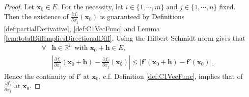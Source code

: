 \begin{proof}
  Let $\mathbf{x}_{0}\in E$.
  For the necessity,
  let $i\in\{1,\cdots,m\}$ and $j\in\{1,\cdots,n\}$ fixed.
  Then the existence of
  $\frac{\partial f_{i}}{\partial x_{j}}(\mathbf{x}_{0})$ is guaranteed by
  Definitions \ref{def:partialDerivative}, \ref{def:C1VecFunc} and
  Lemma \ref{lem:totalDiffImpliesDirectionalDiff}. 
  Using the Hilbert-Schmidt norm gives that
  \begin{align*}
    \forall &\mathbf{h}\in \mathbb{R}^{n}\text{ with }
    \mathbf{x}_{0}+\mathbf{h}\in E,\\
    &\left|\frac{\partial f_{i}}{\partial x_{j}}(\mathbf{x}_{0}+\mathbf{h})
    -\frac{\partial f_{i}}{\partial x_{j}}(\mathbf{x}_{0})\right|
    \le |\mathbf{f}'(\mathbf{x}_{0}+\mathbf{h})-\mathbf{f}'(\mathbf{x}_{0})|.
  \end{align*}
  Hence the continuity of $\mathbf{f}'$ at $\mathbf{x}_{0}$,
  c.f. Definition \ref{def:C1VecFunc}, implies
  that of $\frac{\partial f_{i}}{\partial x_{j}}$ at $\mathbf{x}_{0}$.


\end{proof}

